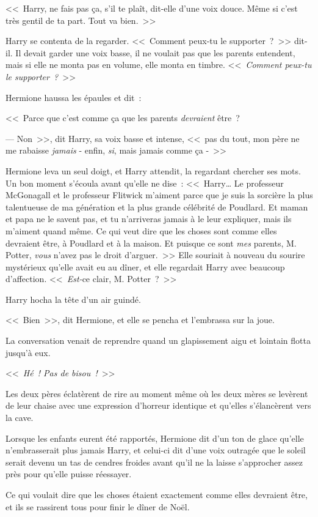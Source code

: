 <<~Harry, ne fais pas ça, s'il te plaît, dit-elle d'une voix douce. Même si c'est très gentil de ta part. Tout va bien.~>>

Harry se contenta de la regarder. <<~Comment peux-tu le supporter~?~>> dit-il. Il devait garder une voix basse, il ne voulait pas que les parents entendent, mais si elle ne monta pas en volume, elle monta en timbre. <<~\emph{Comment peux-tu le supporter~?}~>>

Hermione haussa les épaules et dit~:

<<~Parce que c'est comme ça que les parents \emph{devraient} être~?

--- Non~>>, dit Harry, sa voix basse et intense, <<~pas du tout, mon père ne me rabaisse \emph{jamais} - enfin, \emph{si}, mais jamais comme ça -~>>

Hermione leva un seul doigt, et Harry attendit, la regardant chercher ses mots. Un bon moment s'écoula avant qu'elle ne dise~: <<~Harry… Le professeur McGonagall et le professeur Flitwick m'aiment parce que je suis la sorcière la plus talentueuse de ma génération et la plus grande célébrité de Poudlard. Et maman et papa ne le savent pas, et tu n'arriveras jamais à le leur expliquer, mais ils m'aiment quand même. Ce qui veut dire que les choses sont comme elles devraient être, à Poudlard et à la maison. Et puisque ce sont \emph{mes} parents, M. Potter, \emph{vous} n'avez pas le droit d'arguer.~>> Elle souriait à nouveau du sourire mystérieux qu'elle avait eu au dîner, et elle regardait Harry avec beaucoup d'affection. <<~\emph{Est-}ce clair, M. Potter~?~>>

Harry hocha la tête d'un air guindé.

<<~Bien~>>, dit Hermione, et elle se pencha et l'embrassa sur la joue.

\later

La conversation venait de reprendre quand un glapissement aigu et lointain flotta jusqu'à eux.

<<~\emph{Hé~! Pas de bisou~!}~>>

Les deux pères éclatèrent de rire au moment même où les deux mères se levèrent de leur chaise avec une expression d'horreur identique et qu'elles s'élancèrent vers la cave.

Lorsque les enfants eurent été rapportés, Hermione dit d'un ton de glace qu'elle n'embrasserait plus jamais Harry, et celui-ci dit d'une voix outragée que le soleil serait devenu un tas de cendres froides avant qu'il ne la laisse s'approcher assez près pour qu'elle puisse réessayer.

Ce qui voulait dire que les choses étaient exactement comme elles devraient être, et ils se rassirent tous pour finir le dîner de Noël.

